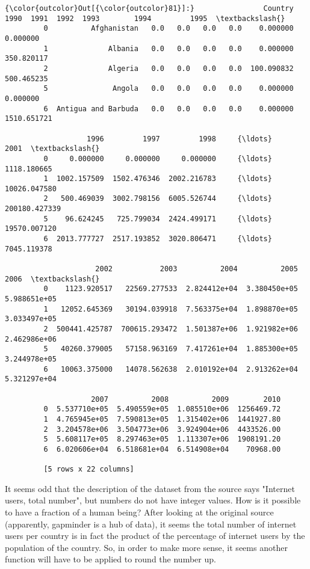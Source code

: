 \documentclass[11pt]{article}
\begin{document}
\begin{Verbatim}[commandchars=\\\{\}]
{\color{outcolor}Out[{\color{outcolor}81}]:}                Country  1990  1991  1992  1993        1994         1995  \textbackslash{}
         0          Afghanistan   0.0   0.0   0.0   0.0    0.000000     0.000000   
         1              Albania   0.0   0.0   0.0   0.0    0.000000   350.820117   
         2              Algeria   0.0   0.0   0.0   0.0  100.090832   500.465235   
         5               Angola   0.0   0.0   0.0   0.0    0.000000     0.000000   
         6  Antigua and Barbuda   0.0   0.0   0.0   0.0    0.000000  1510.651721   
         
                   1996         1997         1998     {\ldots}               2001  \textbackslash{}
         0     0.000000     0.000000     0.000000     {\ldots}        1118.180665   
         1  1002.157509  1502.476346  2002.216783     {\ldots}       10026.047580   
         2   500.469039  3002.798156  6005.526744     {\ldots}      200180.427339   
         5    96.624245   725.799034  2424.499171     {\ldots}       19570.007120   
         6  2013.777727  2517.193852  3020.806471     {\ldots}        7045.119378   
         
                     2002           2003          2004          2005          2006  \textbackslash{}
         0    1123.920517   22569.277533  2.824412e+04  3.380450e+05  5.988651e+05   
         1   12052.645369   30194.039918  7.563375e+04  1.898870e+05  3.033497e+05   
         2  500441.425787  700615.293472  1.501387e+06  1.921982e+06  2.462986e+06   
         5   40260.379005   57158.963169  7.417261e+04  1.885300e+05  3.244978e+05   
         6   10063.375000   14078.562638  2.010192e+04  2.913262e+04  5.321297e+04   
         
                    2007          2008          2009        2010  
         0  5.537710e+05  5.490559e+05  1.085510e+06  1256469.72  
         1  4.765945e+05  7.590813e+05  1.315402e+06  1441927.80  
         2  3.204578e+06  3.504773e+06  3.924904e+06  4433526.00  
         5  5.608117e+05  8.297463e+05  1.113307e+06  1908191.20  
         6  6.020606e+04  6.518681e+04  6.514908e+04    70968.00  
         
         [5 rows x 22 columns]
\end{Verbatim}
            
    It seems odd that the description of the dataset from the source says
"Internet users, total number", but numbers do not have integer values.
How is it possible to have a fraction of a human being? After looking at
the original source (apparently, gapminder is a hub of data), it seems
the total number of internet users per country is in fact the product of
the percentage of internet users by the population of the country. So,
in order to make more sense, it seems another function will have to be
applied to round the number up.
\end{document}
